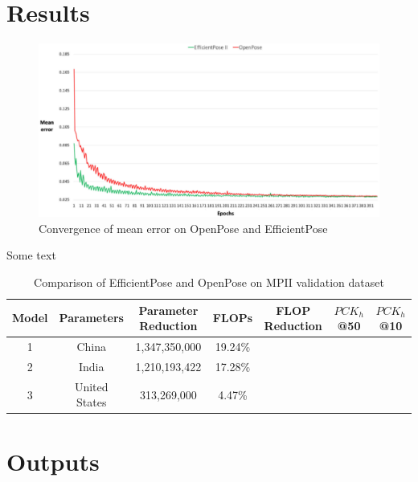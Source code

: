\documentclass{fisatprojectfinal}
\begin{document}
\chapter{Results}

\begin{figure}[h!]
	\begin{center}
	\includegraphics[scale=0.7]{TrainProgression}
	\caption{Convergence of mean error on OpenPose and EfficientPose}
\end{center}
\end{figure}
Some text

\begin{table}[h!]
	\begin{center}
		\caption{Comparison of EfficientPose and OpenPose on MPII validation dataset} 
	\begin{tabular}{|c|c|c|c|c|c|c|}
		
	\hline Model & Parameters & Parameter Reduction  & FLOPs  & FLOP Reduction & \(PCK_h\)@50 & \(PCK_h\)@10 \\ 
	\hline 1 & China & 1,347,350,000 & 19.24\% \\ 
	\hline 2 & India & 1,210,193,422  & 17.28\% \\ 
	\hline 3 & United States & 313,269,000 & 4.47\% \\ 
	\hline 
	\end{tabular}
	\end{center}
	\end{table}


\chapter{Outputs}
\end{document}
